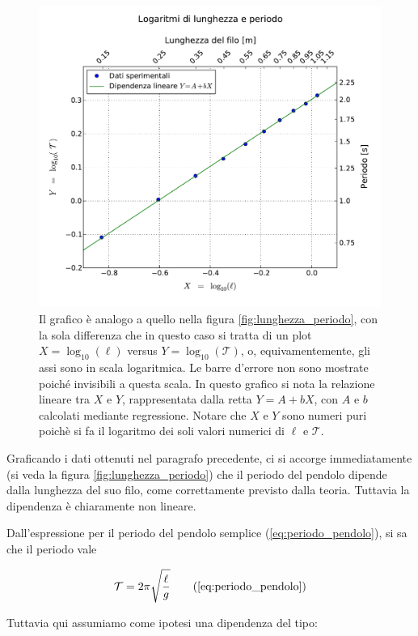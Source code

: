 \begin{figure}
    \centering
    \includegraphics[width=120mm]{immagini/log.pdf}
    \caption{Il grafico è analogo a quello nella figura \ref{fig:lunghezza_periodo}, con la sola differenza
        che in questo caso si tratta di un plot $X = \log_{10} (\ell)$ versus $Y = \log_{10} (\mathcal{T})$, o, equivamentemente,
        gli assi sono in scala logaritmica. Le barre d'errore non sono mostrate poiché invisibili a questa scala.
        In questo grafico si nota la relazione lineare tra $X$ e $Y$, rappresentata dalla retta $Y = A + bX$, con $A$ e $b$ calcolati
    mediante regressione. Notare che $X$ e $Y$ sono numeri puri poichè si fa il logaritmo dei soli valori numerici di $\ell$ e $\mathcal{T}$.}
    \label{fig:lunghezza_periodo_log}
\end{figure}

Graficando i dati ottenuti nel paragrafo precedente, ci si accorge immediatamente (si veda
la figura \ref{fig:lunghezza_periodo}) che il periodo del pendolo dipende dalla lunghezza
del suo filo, come correttamente previsto dalla teoria. Tuttavia la dipendenza è chiaramente non lineare.

Dall'espressione per il periodo del pendolo semplice (\ref{eq:periodo_pendolo}), si sa che
il periodo vale

\begin{equation}
    \mathcal{T} = 2\pi\sqrt{\frac{\ell}{g}}
    \tag{\ref{eq:periodo_pendolo}}
\end{equation}

Tuttavia qui assumiamo come ipotesi una dipendenza del tipo:

